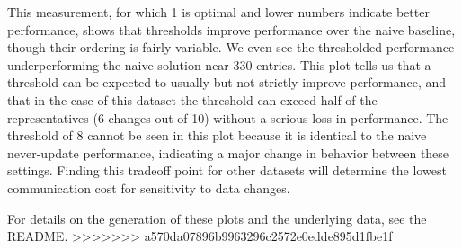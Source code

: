 This measurement, for which 1 is optimal and lower numbers indicate better performance, shows that thresholds improve performance over the naive baseline, though their ordering is fairly variable. We even see the thresholded performance underperforming the naive solution near 330 entries. This plot tells us that a threshold can be expected to usually but not strictly improve performance, and that in the case of this dataset the threshold can exceed half of the representatives (6 changes out of 10) without a serious loss in performance. The threshold of 8 cannot be seen in this plot because it is identical to the naive never-update performance, indicating a major change in behavior between these settings. Finding this tradeoff point for other datasets will determine the lowest communication cost for sensitivity to data changes.

For details on the generation of these plots and the underlying data, see the README.
>>>>>>> a570da07896b9963296c2572e0edde895d1fbe1f

